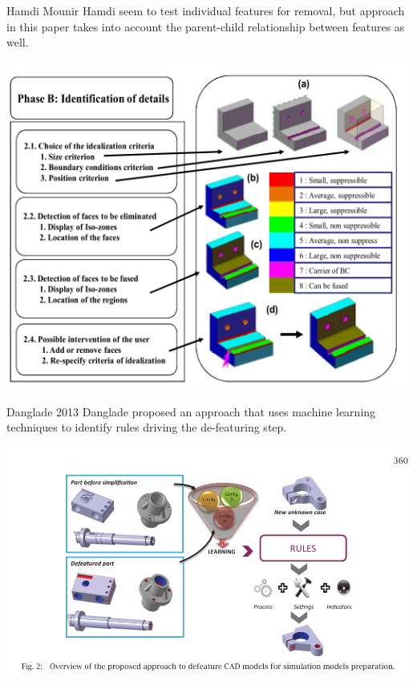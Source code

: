 \begin{frame}{Hamdi Mounir}
 Hamdi \cite{Hamdi2005}  seem to test individual features for removal, but approach in this paper takes into account the parent-child relationship between features as well. 

\includegraphics[width=0.5\linewidth]{..//Common/images/DefeaturingHamdi.png}
\end{frame}

\begin{frame}{Danglade 2013}
Danglade\cite{Danglade2013} proposed an approach that uses machine learning techniques to identify rules driving the de-featuring step.

\includegraphics[width=0.7\linewidth]{..//Common/images/DefeaturingDanglade.png}
\end{frame}
